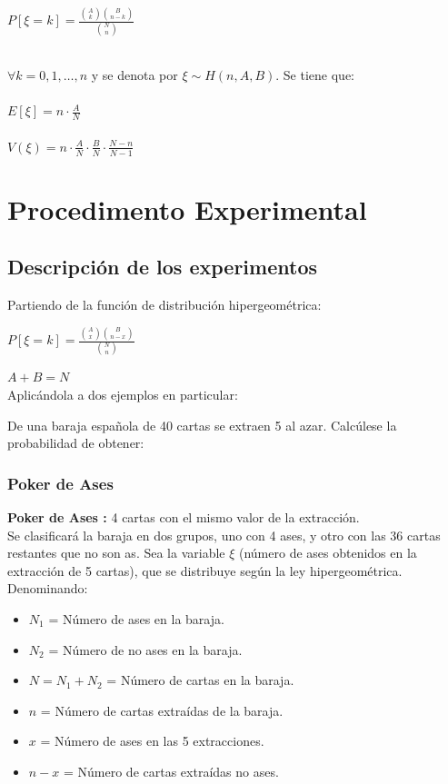 \documentclass[spanish,a4paper,12pt]{report}
\begin{document}
\centerline{$P[\xi = k] = \frac {\binom {A} {k} \binom {B} {n-k}} { \binom {N} {n} }$}
\ \\
$\forall k=0,1,…,n$ y se denota por $\xi \sim H(n ,A ,B)$. Se tiene que:\\
\ \\
$E[\xi] = n \cdot \frac{A}{N}$\\
\ \\
$V(\xi) = n \cdot \frac{A}{N} \cdot \frac{B}{N} \cdot \frac{N-n}{N-1}$\\ 

\chapter{\textbf Procedimento Experimental}
\section{Descripción de los experimentos}
Partiendo de la función de distribución hipergeométrica:
\ \\
\centerline{$P[\xi = k] = \frac {\binom {A} {x} \binom {B} {n-x}} { \binom {N} {n} }$}
$A + B = N$
\ \\
Aplicándola a dos ejemplos en particular:

De una baraja española de 40 cartas se extraen 5 al azar. Calcúlese la probabilidad de obtener:
\subsection{Poker de Ases}
\textbf{Poker de Ases :} 4 cartas con el mismo valor de la extracción.\\ 

Se clasificará la baraja en dos grupos, uno con 4 ases, y otro con las 36 cartas restantes que no son as.
Sea la variable $\xi$ (número de ases obtenidos en la extracción de 5 cartas), que se distribuye según la ley hipergeométrica.\\ 
Denominando:\\


\begin{itemize}
\item{$N_1$ = Número de ases en la baraja.}
\item{$N_2$ = Número de no ases en la baraja.}
\item{$N=N_1 + N_2$ = Número de cartas en la baraja.}
\item{$n$ = Número de cartas extraídas de la baraja.}
\item{$x$ = Número de ases en las 5 extracciones.}
\item{$n-x$ = Número de cartas extraídas no ases.}
\end{itemize}
\end{document}
